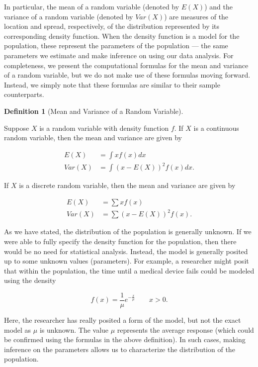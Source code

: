 \documentclass[
  letterpaper,
  DIV=11,
  numbers=noendperiod]{scrreprt}
\theoremstyle{definition}
\theoremstyle{definition}
\newtheorem{definition}{Definition}[chapter]
\theoremstyle{remark}
\begin{document}
In particular, the mean of a random variable (denoted by \(E(X)\)) and
the variance of a random variable (denoted by \(Var(X)\)) are measures
of the location and spread, respectively, of the distribution
represented by its corresponding density function. When the density
function is a model for the population, these represent the parameters
of the population --- the same parameters we estimate and make inference
on using our data analysis. For completeness, we present the
computational formulas for the mean and variance of a random variable,
but we do not make use of these formulas moving forward. Instead, we
simply note that these formulas are similar to their sample
counterparts.

\begin{definition}[Mean and Variance of a Random
Variable]\protect\hypertarget{def-rv-mean-variance}{}\label{def-rv-mean-variance}

Suppose \(X\) is a random variable with density function \(f\). If \(X\)
is a continuous random variable, then the mean and variance are given by

\[
\begin{aligned}
  E(X) &= \int x f(x) dx \\
  Var(X) &= \int \left(x - E(X)\right)^2 f(x) dx.
\end{aligned}
\]

If \(X\) is a discrete random variable, then the mean and variance are
given by

\[
\begin{aligned}
  E(X) &= \sum x f(x) \\
  Var(X) &= \sum \left(x - E(X)\right)^2 f(x).
\end{aligned}
\]

\end{definition}

As we have stated, the distribution of the population is generally
unknown. If we were able to fully specify the density function for the
population, then there would be no need for statistical analysis.
Instead, the model is generally posited up to some unknown values
(parameters). For example, a researcher might posit that within the
population, the time until a medical device fails could be modeled using
the density

\[f(x) = \frac{1}{\mu} e^{-\frac{x}{\mu}} \qquad x > 0.\]

Here, the researcher has really posited a form of the model, but not the
exact model as \(\mu\) is unknown. The value \(\mu\) represents the
average response (which could be confirmed using the formulas in the
above definition). In such cases, making inference on the parameters
allows us to characterize the distribution of the population.
\end{document}
